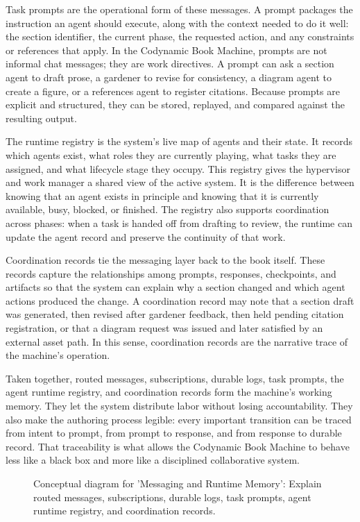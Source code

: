 \documentclass[11pt]{article}
\begin{document}
Task prompts are the operational form of these messages. A prompt packages the instruction an agent should execute, along with the context needed to do it well: the section identifier, the current phase, the requested action, and any constraints or references that apply. In the Codynamic Book Machine, prompts are not informal chat messages; they are work directives. A prompt can ask a section agent to draft prose, a gardener to revise for consistency, a diagram agent to create a figure, or a references agent to register citations. Because prompts are explicit and structured, they can be stored, replayed, and compared against the resulting output.

The runtime registry is the system's live map of agents and their state. It records which agents exist, what roles they are currently playing, what tasks they are assigned, and what lifecycle stage they occupy. This registry gives the hypervisor and work manager a shared view of the active system. It is the difference between knowing that an agent exists in principle and knowing that it is currently available, busy, blocked, or finished. The registry also supports coordination across phases: when a task is handed off from drafting to review, the runtime can update the agent record and preserve the continuity of that work.

Coordination records tie the messaging layer back to the book itself. These records capture the relationships among prompts, responses, checkpoints, and artifacts so that the system can explain why a section changed and which agent actions produced the change. A coordination record may note that a section draft was generated, then revised after gardener feedback, then held pending citation registration, or that a diagram request was issued and later satisfied by an external asset path. In this sense, coordination records are the narrative trace of the machine's operation.

Taken together, routed messages, subscriptions, durable logs, task prompts, the agent runtime registry, and coordination records form the machine's working memory. They let the system distribute labor without losing accountability. They also make the authoring process legible: every important transition can be traced from intent to prompt, from prompt to response, and from response to durable record. That traceability is what allows the Codynamic Book Machine to behave less like a black box and more like a disciplined collaborative system.

\begin{figure}[htbp]
\centering

\caption{Conceptual diagram for 'Messaging and Runtime Memory': Explain routed messages, subscriptions, durable logs, task prompts, agent runtime registry, and coordination records.}
\end{figure}
\end{document}
